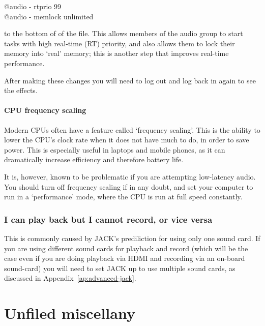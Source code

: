 \documentclass[10pt,a4paper]{book}
\begin{document}
\begin{listing}
@audio - rtprio 99\\
@audio - memlock unlimited
\end{listing}

to the bottom of of the file.  This allows members of the audio group
to start tasks with high real-time (RT) priority, and also allows them
to lock their memory into `real' memory; this is another step that
improves real-time performance.

After making these changes you will need to log out and log back in
again to see the effects.


\subsubsection{CPU frequency scaling}

Modern CPUs often have a feature called `frequency scaling'.  This is
the ability to lower the CPU's clock rate when it does not have much
to do, in order to save power.  This is especially useful in laptops
and mobile phones, as it can dramatically increase efficiency and
therefore battery life.

It is, however, known to be problematic if you are attempting
low-latency audio.  You should turn off frequency scaling if in any
doubt, and set your computer to run in a `performance' mode, where the
CPU is run at full speed constantly.


\subsection{I can play back but I cannot record, or vice versa}

This is commonly caused by JACK's prediliction for using only
one sound card.  If you are using different sound cards for playback
and record (which will be the case even if you are doing playback via
HDMI and recording via an on-board sound-card) you will need to set
JACK up to use multiple sound cards, as discussed in
Appendix~\ref{ap:advanced-jack}.




\chapter{Unfiled miscellany}
\end{document}
